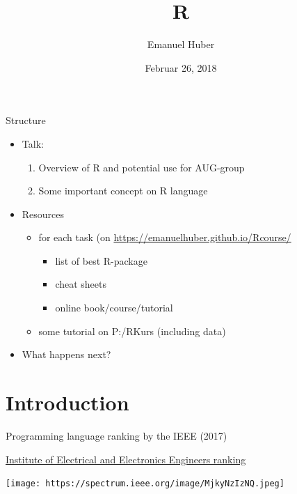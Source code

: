 \documentclass[8pt,ignorenonframetext,]{beamer}
\title{R}
\author{Emanuel Huber}
\date{Februar 26, 2018}
\providecommand{\tightlist}{%
  \setlength{\itemsep}{0pt}\setlength{\parskip}{0pt}}
\begin{document}
\frame{\titlepage}

\begin{frame}

\end{frame}

\begin{frame}{Structure}

\begin{itemize}
\tightlist
\item
  Talk:

  \begin{enumerate}
  \def\labelenumi{\arabic{enumi}.}
  \tightlist
  \item
    Overview of R and potential use for AUG-group
  \item
    Some important concept on R language
  \end{enumerate}
\item
  Resources

  \begin{itemize}
  \tightlist
  \item
    for each task (on \url{https://emanuelhuber.github.io/Rcourse/}

    \begin{itemize}
    \tightlist
    \item
      list of best R-package
    \item
      cheat sheets
    \item
      online book/course/tutorial
    \end{itemize}
  \item
    some tutorial on P:/RKurs (including data)
  \end{itemize}
\item
  What happens next?
\end{itemize}

\end{frame}

\section{Introduction}\label{introduction}

\begin{frame}{Programming language ranking by the IEEE (2017)}

\href{https://spectrum.ieee.org/computing/software/the-2017-top-programming-languages}{Institute
of Electrical and Electronics Engineers ranking}

\texttt{[image: https://spectrum.ieee.org/image/MjkyNzIzNQ.jpeg]}

\end{frame}
\end{document}
